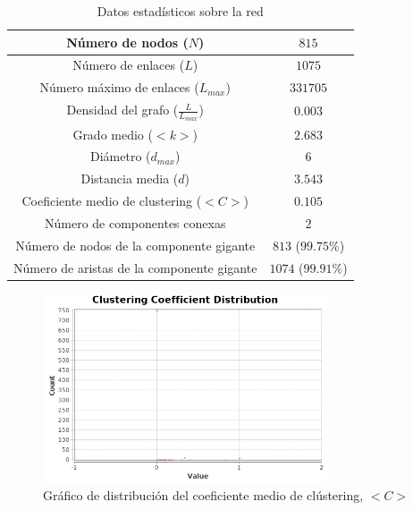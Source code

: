 \documentclass[10pt,a4paper,spanish]{article}
\numberwithin{equation}{section} %
\numberwithin{figure}{section} %
\numberwithin{table}{section} %
\begin{document}
\begin{table}[!h]
\centering
\begin{tabular}{| c | c |}
\hline
Número de nodos ($N$) & $815$ \\
\hline
Número de enlaces ($L$) & $1075$ \\
\hline
Número máximo de enlaces ($L_{max}$) & $331705$ \\
\hline
Densidad del grafo ($\frac{L}{L_{max}}$) & $0.003$ \\
\hline
Grado medio ($<k>$) & $2.683$ \\
\hline
Diámetro ($d_{max}$) & $6$ \\
\hline
Distancia media ($d$) & $3.543$ \\
\hline
Coeficiente medio de clustering ($<C>$) & $0.105$ \\
\hline
Número de componentes conexas & $2$ \\
\hline
Número de nodos de la componente gigante & $813$ ($99.75\%$)\\
\hline
Número de aristas de la componente gigante & $1074$ ($99.91\%$)\\
\hline
\end{tabular}
\caption{Datos estadísticos sobre la red}
\label{tabla}
\end{table}


\begin{figure}[!h]
    \centering
    \includegraphics[width=0.75\textwidth]{../coeficiente_medio_clustering/clustering-coefficient}
    \caption{Gráfico de distribución del coeficiente medio de clústering, $<C>$}
    \label{coeficientemedioclustering}
\end{figure}
\end{document}
